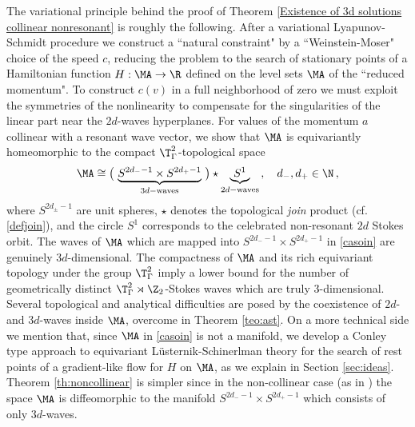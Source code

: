 \documentclass[11pt,a4paper,reqno]{article}
\numberwithin{equation}{section}
\theoremstyle{definition}
\begin{document}
The variational 
principle behind the
proof of 
Theorem \ref{Existence of 3d solutions collinear nonresonant}
is roughly the following. 
After a  variational Lyapunov-Schmidt procedure we construct a ``natural constraint"  by a ``Weinstein-Moser" choice of the  speed $ c $, reducing  
the problem  
to the search of stationary points of a Hamiltonian function 
$  H : \MA \to \R  $ 
defined on the 
level sets $ \MA $ 
of the ``reduced momentum".
To construct $ c(v) $  
in a full neighborhood of zero 
we must  exploit  the symmetries of the nonlinearity to compensate for  the singularities  of the linear part near the 
$2d$-waves hyperplanes.
For values  of the momentum $a$ collinear with a resonant wave vector, we show that 
$ \MA $ is equivariantly homeomorphic to 
the  compact $ \T^2_\Gamma$-topological space 
\begin{equation}
\label{casoin}
\MA  \cong \big( \, 
\underbrace{S^{2d_- -1} \times 
S^{2d_+-1}}_{3d-\text{waves}} \, \big)  \star \underbrace{S^{1}}_{2d-\text{waves}} \, , \quad d_-,d_+ \in \N  \, ,
\end{equation}
where $ S^{2 d_\pm -1}$
are unit spheres, 
$\star$ denotes the topological {\it join} 
product (cf. \eqref{defjoin}), and 
the  circle    
$ S^{1} $ corresponds to the celebrated non-resonant  $ 2 d $ Stokes orbit.
The waves of $ \MA $ which 
are 
mapped into 
$ S^{2d_- -1} \times 
S^{2d_+-1} $ in \eqref{casoin}  are genuinely $ 3d$-dimensional.
The compactness of $ \MA $ and its rich equivariant  topology under the group $ \T^2_\Gamma $  
imply a lower bound 
for the number of geometrically distinct
$ \T^2_\Gamma \rtimes \Z_2 $-Stokes  waves which are  truly $3$-dimensional. 
Several %
topological and analytical difficulties are posed 
by the coexistence of  $2d$- and $3d$-waves inside $\MA $, overcome 
in  Theorem \ref{teo:ast}.   
On a more technical side
we  mention that, since $ \MA $ in \eqref{casoin} is not a manifold, 
we  
develop a Conley type approach 
to  equivariant L\"usternik-Schinerlman theory 
for 
the search of rest points of  a gradient-like flow for $ H $ on $ \MA $, 
as we explain in Section \ref{sec:ideas}. 
Theorem \ref{th:noncollinear} is simpler since  in the non-collinear case
(as in \cite{CN}) the space 
$ \MA $
is %
diffeomorphic to the manifold $ S^{2d_- -1} \times 
S^{2d_+-1} $ which consists of only $ 3 d$-waves.
\end{document}
